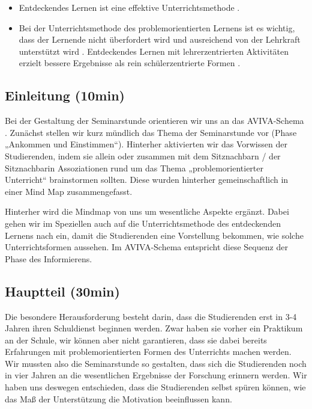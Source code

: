 \documentclass[man,12pt,a4paper]{apa6}
\begin{document}
\begin{itemize}
  \item Entdeckendes Lernen ist eine effektive Unterrichtsmethode \parencite{furtak2012}.
  \item Bei der Unterrichtsmethode des problemorientierten Lernens ist es wichtig, dass der Lernende nicht überfordert wird und ausreichend von der Lehrkraft unterstützt wird \parencite{kunter2013}. Entdeckendes Lernen mit lehrerzentrierten Aktivitäten erzielt bessere Ergebnisse als rein schülerzentrierte Formen \parencite{furtak2012}.
\end{itemize}

\subsection{Einleitung (10min)}

Bei der Gestaltung der Seminarstunde orientieren wir uns an das AVIVA-Schema \parencite{aviva}. Zunächst stellen wir kurz mündlich das Thema der Seminarstunde vor (Phase „Ankommen und Einstimmen“). Hinterher aktivierten wir das Vorwissen der Studierenden, indem sie allein oder zusammen mit dem Sitznachbarn / der Sitznachbarin Assoziationen rund um das Thema „problemorientierter Unterricht“ brainstormen sollten. Diese wurden hinterher gemeinschaftlich in einer Mind Map zusammengefasst.

Hinterher wird die Mindmap von uns um wesentliche Aspekte ergänzt. Dabei gehen wir im Speziellen auch auf die Unterrichtsmethode des entdeckenden Lernens nach \textcite{hameyer2008} ein, damit die Studierenden eine Vorstellung bekommen, wie solche Unterrichtsformen aussehen. Im AVIVA-Schema entspricht diese Sequenz der Phase des Informierens.

\subsection{Hauptteil (30min)}

Die besondere Herausforderung besteht darin, dass die Studierenden erst in 3-4 Jahren ihren Schuldienst beginnen werden. Zwar haben sie vorher ein Praktikum an der Schule, wir können aber nicht garantieren, dass sie dabei bereits Erfahrungen mit problemorientierten Formen des Unterrichts machen werden. Wir mussten also die Seminarstunde so gestalten, dass sich die Studierenden noch in vier Jahren an die wesentlichen Ergebnisse der Forschung erinnern werden. Wir haben uns deswegen entschieden, dass die Studierenden selbst spüren können, wie das Maß der Unterstützung die Motivation beeinflussen kann.
\end{document}
